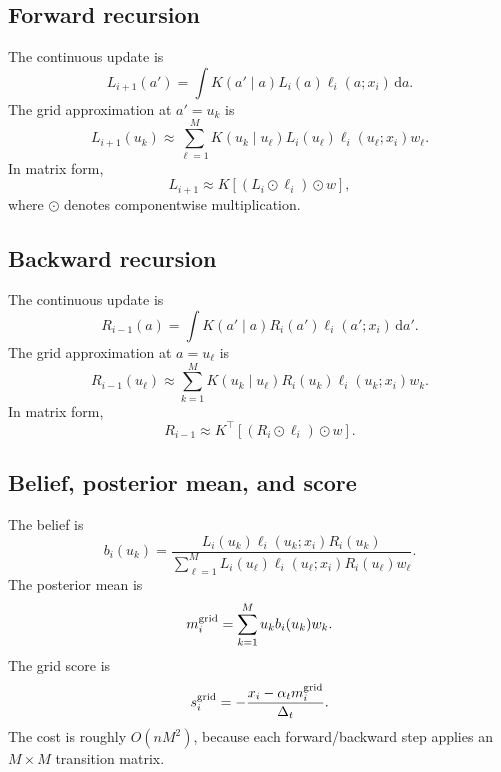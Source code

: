 \documentclass[11pt]{article}
\begin{document}
\subsection{Forward recursion}

The continuous update is
\begin{equation}
  L_{i+1}(a')=\int K(a'\mid a)L_i(a)\ell_i(a;x_i)\,\mathrm{d}a.
\end{equation}
The grid approximation at \(a'=u_k\) is
\begin{equation}
  L_{i+1}(u_k)
  \approx
  \sum_{\ell=1}^M K(u_k\mid u_\ell)L_i(u_\ell)\ell_i(u_\ell;x_i)w_\ell.
  \label{eq:grid-forward}
\end{equation}
In matrix form,
\begin{equation}
  L_{i+1}\approx K\left[(L_i\odot \ell_i)\odot w\right],
\end{equation}
where \(\odot\) denotes componentwise multiplication.

\subsection{Backward recursion}

The continuous update is
\begin{equation}
  R_{i-1}(a)=\int K(a'\mid a)R_i(a')\ell_i(a';x_i)\,\mathrm{d}a'.
\end{equation}
The grid approximation at \(a=u_\ell\) is
\begin{equation}
  R_{i-1}(u_\ell)
  \approx
  \sum_{k=1}^M K(u_k\mid u_\ell)R_i(u_k)\ell_i(u_k;x_i)w_k.
  \label{eq:grid-backward}
\end{equation}
In matrix form,
\begin{equation}
  R_{i-1}\approx K^\top\left[(R_i\odot \ell_i)\odot w\right].
\end{equation}

\subsection{Belief, posterior mean, and score}

The belief is
\begin{equation}
  b_i(u_k)
  =
  \frac{L_i(u_k)\ell_i(u_k;x_i)R_i(u_k)}
  {\sum_{\ell=1}^M L_i(u_\ell)\ell_i(u_\ell;x_i)R_i(u_\ell)w_\ell}.
\end{equation}
The posterior mean is
\begin{equation}
  m_i^{\rm grid}
  = \sum_{k=1}^M u_k b_i(u_k)w_k.
\end{equation}
The grid score is
\begin{equation}
  s_i^{\rm grid}
  = -\frac{x_i-\alpha_t m_i^{\rm grid}}{\Delta_t}.
\end{equation}
The cost is roughly \(O(nM^2)\), because each forward/backward step applies an \(M\times M\) transition matrix.
\end{document}
